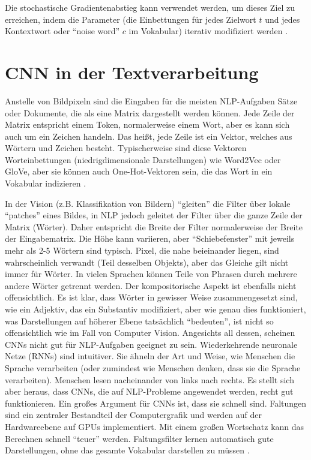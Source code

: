 Die stochastische Gradientenabstieg kann verwendet werden, um dieses Ziel zu erreichen, indem die Parameter (die Einbettungen für jedes Zielwort $t$ und jedes Kontextwort oder \enquote{noise word} $c$ im Vokabular) iterativ modifiziert werden \cite*[114]{Jurafskya}.


\section{CNN in der Textverarbeitung}
Anstelle von Bildpixeln sind die Eingaben für die meisten NLP-Aufgaben Sätze oder Dokumente, die als eine Matrix dargestellt werden können. Jede Zeile der Matrix entspricht einem Token, normalerweise einem Wort, aber es kann sich auch um ein Zeichen handeln. Das heißt, jede Zeile ist ein Vektor, welches aus Wörtern und Zeichen besteht. Typischerweise sind diese Vektoren Worteinbettungen (niedrigdimensionale Darstellungen) wie Word2Vec oder GloVe, aber sie können auch One-Hot-Vektoren sein, die das Wort in ein Vokabular indizieren \cite*{Zhang}.

In der Vision (z.B. Klassifikation von Bildern) \enquote{gleiten} die Filter über lokale \enquote{patches} eines Bildes, in NLP jedoch geleitet der Filter über die ganze Zeile der Matrix (Wörter). Daher entspricht die Breite der Filter normalerweise der Breite der Eingabematrix. Die Höhe kann variieren, aber \enquote{Schiebefenster} mit jeweils mehr als 2-5 Wörtern sind typisch. Pixel, die nahe beieinander liegen, sind wahrscheinlich verwandt (Teil desselben Objekts), aber das Gleiche gilt nicht immer für Wörter. In vielen Sprachen können Teile von Phrasen durch mehrere andere Wörter getrennt werden. Der kompositorische Aspekt ist ebenfalls nicht offensichtlich. Es ist klar, dass Wörter in gewisser Weise zusammengesetzt sind, wie ein Adjektiv, das ein Substantiv modifiziert, aber wie genau dies funktioniert, was Darstellungen auf höherer Ebene tatsächlich \enquote{bedeuten}, ist nicht so offensichtlich wie im Fall von Computer Vision. Angesichts all dessen, scheinen CNNs nicht gut für NLP-Aufgaben geeignet zu sein. Wiederkehrende neuronale Netze (RNNs) sind intuitiver. Sie ähneln der Art und Weise, wie Menschen die Sprache verarbeiten (oder zumindest wie Menschen denken, dass sie die Sprache verarbeiten). Menschen lesen nacheinander von links nach rechts. Es stellt sich aber heraus, dass CNNs, die auf NLP-Probleme angewendet werden, recht gut funktionieren. Ein großes Argument für CNNs ist, dass sie schnell sind. Faltungen sind ein zentraler Bestandteil der Computergrafik und werden auf der Hardwareebene auf GPUs implementiert. Mit einem großen Wortschatz kann das Berechnen schnell \enquote{teuer} werden. Faltungsfilter lernen automatisch gute Darstellungen, ohne das gesamte Vokabular darstellen zu müssen \cite*{widlml}.

